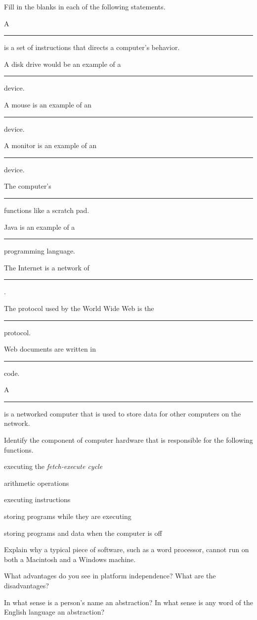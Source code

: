 \begin{EXRtwo}
\item Fill in the blanks in each of the following statements.
\begin{EXRtwoLL}
\baselineskip=13pt\item A \rule{50pt}{0.5pt} is a set of instructions
that directs a computer's behavior.
\item  A disk drive would be an example of a \rule{60pt}{0.5pt}  device.
\item  A mouse is an example of an  \rule{60pt}{0.5pt}  device.
\item  A monitor is an example of an  \rule{60pt}{0.5pt}  device.
\item  The computer's \rule{60pt}{0.5pt} functions like a scratch pad.
\item  Java is an example of a \rule{60pt}{0.5pt}  programming language.
\item  The Internet is a network of \rule{60pt}{0.5pt} .
\item  The protocol used by the World Wide Web is the \rule{60pt}{0.5pt} 
protocol.
\item  Web documents are written in \rule{60pt}{0.5pt} code.
\item  A \rule{60pt}{0.5pt}  is a networked computer that is used to store data
for other computers on the network.
\end{EXRtwoLL}

\baselineskip=11pt\item  Identify the component of computer hardware that is
responsible for the following functions.
\begin{EXRtwoLL}
\item  executing the {\it fetch-execute cycle}
\item  arithmetic operations
\item  executing instructions
\item  storing programs while they are executing
\item  storing programs and data when the computer is off
\end{EXRtwoLL}

\item  Explain why a typical piece of software, such as a
word processor, cannot run on both a Macintosh and a Windows
machine.

\item  What advantages do you see in platform independence?
What are the disadvantages?

\item  In what sense is a person's name an abstraction?
In what sense is any word of the English language an abstraction?


\end{EXRtwo}

